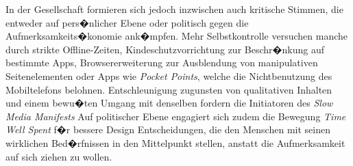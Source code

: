 In der Gesellschaft formieren sich jedoch inzwischen auch kritische Stimmen, die entweder auf pers�nlicher Ebene oder politisch gegen die Aufmerksamkeits�konomie ank�mpfen. Mehr Selbstkontrolle versuchen manche durch strikte Offline-Zeiten, Kindeschutzvorrichtung zur Beschr�nkung auf bestimmte Apps, Browsererweiterung zur Ausblendung von manipulativen Seitenelementen oder Apps wie \textit{Pocket Points}, welche die Nichtbenutzung des Mobiltelefons belohnen.  
Entschleunigung zugunsten von qualitativen Inhalten und einem bewu�ten Umgang mit denselben fordern die Initiatoren des \textit{Slow Media Manifests}
Auf politischer Ebene engagiert sich zudem die Bewegung \textit{Time Well Spent}  f�r bessere Design Entscheidungen, die den Menschen mit seinen wirklichen Bed�rfnissen in den Mittelpunkt stellen, anstatt die Aufmerksamkeit auf sich ziehen zu wollen.
 




